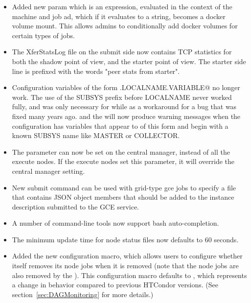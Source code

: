 \begin{itemize}

\item Added new param  which is an expression,
evaluated in the context of the machine and job ad, which if it evaluates to a string,
becomes a docker volume mount.  This allows admins to conditionally add docker volumes
for certain types of jobs.

\item The XferStatsLog file on the submit side now contains TCP statistics for both the
shadow point of view, and the starter point of view.  The starter side line is prefixed
with the words "peer stats from starter".

\item Configuration variables of the form \verb@SUBSYS.LOCALNAME.VARIABLE@ no longer work.
The use of the SUBSYS prefix before LOCALNAME never worked fully, and was only necessary for while
as a workaround for a bug that was fixed many years ago.  and the  will
now produce warning messages when the configuration has variables that appear to of this form and
begin with a known SUBSYS name like MASTER or COLLECTOR.

\item The  parameter can now be set on the central manager,
instead of all the execute nodes.  If the execute nodes set this parameter, it
will override the central manager setting.

\item New submit command  can be used with
grid-type gce jobs to specify a file that contains JSON object members
that should be added to the instance description submitted to the GCE
service.

\item A number of command-line tools now support bash auto-completion.

\item The minimum update time for  node status files
now defaults to 60 seconds.

\item Added the new  configuration
macro, which allows users to configure whether  itself
removes its node jobs when it is removed (note that the
node jobs are also removed by the ).
This configuration macro defaults to , which represents
a change in behavior compared to previous HTCondor versions.
(See section~\ref{sec:DAGMonitoring} for more details.)


\end{itemize}
